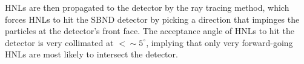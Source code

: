 HNLs are then propagated to the detector by the ray tracing method, which forces HNLs to hit the SBND detector by picking a direction that impinges the particles at the detector's front face.  
The acceptance angle of HNLs to hit the detector is very collimated at $< \sim 5^\circ$, implying that only very forward-going HNLs are most likely to intersect the detector.

%

